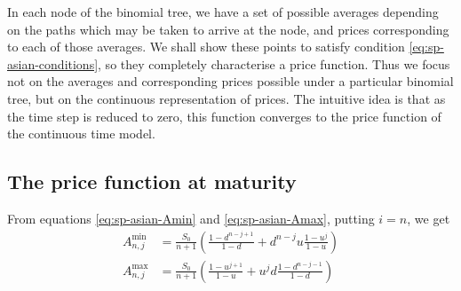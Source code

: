 In each node of the binomial tree, we have a set of possible averages depending on the paths which may be taken to arrive at the node, and prices corresponding to each of those averages. We shall show these points to satisfy condition \ref{eq:sp-asian-conditions}, so they completely characterise a price function. Thus we focus not on the averages and corresponding prices possible under a particular binomial tree, but on the continuous representation of prices. The intuitive idea is that as the time step is reduced to zero, this function converges to the price function of the continuous time model.





\subsection{The price function at maturity}
\label{subsec:sp-asian-eu-price-maturity}

From equations \ref{eq:sp-asian-Amin} and \ref{eq:sp-asian-Amax}, putting $i = n$, we get
\begin{align*}
	A_{n,j}^{\min} &= \frac{S_0}{n+1} \left( \frac{1 - d^{n-j+1}}{1-d} + d^{n-j} u \frac{1 - u^{j}}{1-u} \right) \\
	A_{n,j}^{\max} &= \frac{S_0}{n+1} \left( \frac{1 - u^{j+1}}{1-u} + u^{j} d \frac{1 - d^{n-j-1}}{1-d} \right)
\end{align*}

